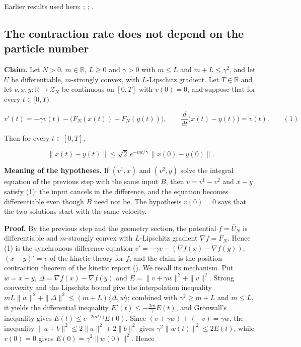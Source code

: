 \documentclass[11pt,a4paper]{report}
\begin{document}
Earlier results used here: \cite[Section~3.1.1]{LangevinLean2026IPLA}; \cite[Section~3.1.1]{LangevinLean2026Kinetic}; \cite[Section~3.1.3]{LangevinLean2026Kinetic}.
\subsection{\texorpdfstring{The contraction rate does not depend on the particle number}{The contraction rate does not depend on the particle number}}
\label{report-step-KIPLMC-Dynamics-lean-3}


\textbf{Claim.} Let \(N>0\), \(m\in\mathbb R\), \(L\ge0\) and \(\gamma>0\) with \(m\le L\) and \(m+L\le\gamma^2\), and let \(U\) be differentiable, \(m\)-strongly convex, with \(L\)-Lipschitz gradient. Let \(T\in\mathbb R\) and let \(v,x,y:\mathbb R\to\mathcal Z_N\) be continuous on \([0,T]\) with \(v(0)=0\), and suppose that for every \(t\in[0,T)\)


\[v'(t)=-\gamma v(t)-\bigl(F_N(x(t))-F_N(y(t))\bigr),\qquad\frac{d}{dt}\bigl(x(t)-y(t)\bigr)=v(t).\qquad(1)\]


Then for every \(t\in[0,T]\),


\[\|x(t)-y(t)\|\le\sqrt2\,e^{-mt/\gamma}\,\|x(0)-y(0)\|.\]


\textbf{Meaning of the hypotheses.} If \((v^1,x)\) and \((v^2,y)\) solve the integral equation of the previous step with the same input \(B\), then \(v=v^1-v^2\) and \(x-y\) satisfy (1): the input cancels in the difference, and the equation becomes differentiable even though \(B\) need not be. The hypothesis \(v(0)=0\) says that the two solutions start with the same velocity.




\textbf{Proof.} By the previous step and the geometry section, the potential \(f=\bar U_N\) is differentiable and \(m\)-strongly convex with \(L\)-Lipschitz gradient \(\nabla f=F_N\). Hence (1) is the synchronous difference equation \(v'=-\gamma v-(\nabla f(x)-\nabla f(y))\), \((x-y)'=v\) of the kinetic theory for \(f\), and the claim is the position contraction theorem of the kinetic report (\cite[Section~3.6.5]{LangevinLean2026Kinetic}). We recall its mechanism. Put \(w=x-y\), \(\Delta=\nabla f(x)-\nabla f(y)\) and \(E=\|v+\gamma w\|^2+\|v\|^2\). Strong convexity and the Lipschitz bound give the interpolation inequality \(mL\|w\|^2+\|\Delta\|^2\le(m+L)\langle\Delta,w\rangle\); combined with \(\gamma^2\ge m+L\) and \(m\le L\), it yields the differential inequality \(E'(t)\le-\frac{2m}\gamma E(t)\), and Grönwall's inequality gives \(E(t)\le e^{-2mt/\gamma}E(0)\). Since \((v+\gamma w)+(-v)=\gamma w\), the inequality \(\|a+b\|^2\le2\|a\|^2+2\|b\|^2\) gives \(\gamma^2\|w(t)\|^2\le2E(t)\), while \(v(0)=0\) gives \(E(0)=\gamma^2\|w(0)\|^2\). Hence
\end{document}
